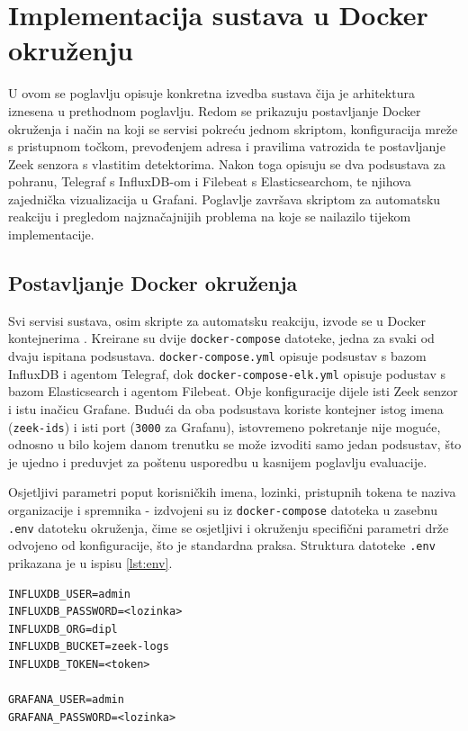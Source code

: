 \chapter{Implementacija sustava u \mbox{Docker} okruženju}

U ovom se poglavlju opisuje konkretna izvedba sustava čija je arhitektura iznesena u prethodnom poglavlju. Redom se prikazuju postavljanje Docker okruženja i način na koji se servisi 
pokreću jednom skriptom, konfiguracija mreže s pristupnom točkom, prevođenjem adresa i pravilima vatrozida te postavljanje Zeek senzora s vlastitim detektorima. Nakon toga opisuju se dva 
podsustava za pohranu, Telegraf s InfluxDB-om i Filebeat s Elasticsearchom, te njihova zajednička vizualizacija u Grafani. Poglavlje završava skriptom za automatsku reakciju i pregledom 
najznačajnijih problema na koje se nailazilo tijekom implementacije.

\section{Postavljanje Docker okruženja}

Svi servisi sustava, osim skripte za automatsku reakciju, izvode se u Docker kontejnerima \cite{docker_docs}. Kreirane su dvije \texttt{docker-compose} datoteke, jedna za svaki
od dvaju ispitana podsustava. \texttt{docker-compose.yml} opisuje podsustav s bazom InfluxDB i agentom Telegraf, dok \texttt{docker-compose-elk.yml} opisuje podustav s bazom
Elasticsearch i agentom Filebeat. Obje konfiguracije dijele isti Zeek senzor i istu inačicu Grafane. Budući da oba podsustava koriste kontejner istog imena (\texttt{zeek-ids}) i isti
port (\texttt{3000} za Grafanu), istovremeno pokretanje nije moguće, odnosno u bilo kojem danom trenutku se može izvoditi samo jedan podsustav, što je ujedno i preduvjet za poštenu usporedbu
u kasnijem poglavlju evaluacije.

Osjetljivi parametri poput korisničkih imena, lozinki, pristupnih tokena te naziva organizacije i spremnika  - izdvojeni su iz \texttt{docker-compose} datoteka u zasebnu
\texttt{.env} datoteku okruženja, čime se osjetljivi i okruženju specifični parametri drže odvojeno od konfiguracije, što je standardna praksa. Struktura datoteke \texttt{.env} prikazana je u ispisu \ref{lst:env}.
\newpage
\begin{lstlisting}[caption={Struktura \texttt{.env} datoteke (lozinke i pristupni tokeni skriveni)}, label={lst:env}]
INFLUXDB_USER=admin
INFLUXDB_PASSWORD=<lozinka>
INFLUXDB_ORG=dipl
INFLUXDB_BUCKET=zeek-logs
INFLUXDB_TOKEN=<token>

GRAFANA_USER=admin
GRAFANA_PASSWORD=<lozinka>
\end{lstlisting}

